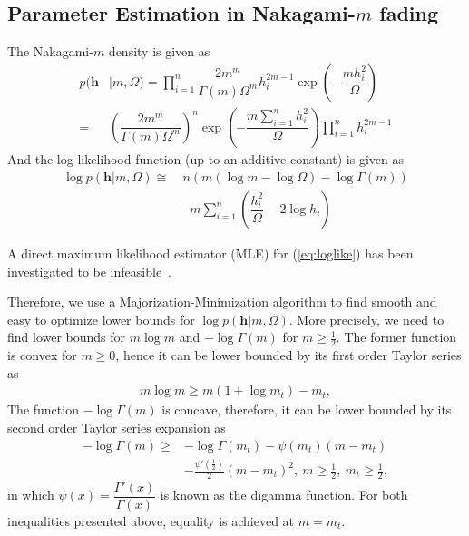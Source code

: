 \documentclass[conference, 10pt]{IEEEtran}
\begin{document}
\subsection{Parameter Estimation in Nakagami-$m$ fading}
The Nakagami-$m$ density is given as
\begin{align}
    p(\bm{h} &| m, \Omega) = \prod_{i=1}^{n}\dfrac{2m^m}{\Gamma(m)\Omega^{m}}h_i^{2m - 1}
              \exp\left(-\dfrac{mh_i^2}{\Omega}\right) \nonumber \\
          = & \left(\dfrac{2m^m}{\Gamma(m)\Omega^{m}}\right)^{n}
          \exp\left(-\dfrac{m\sum_{i=1}^{n}h_i^2}{\Omega}\right) \prod_{i=1}^{n}h_i^{2m - 1}
\end{align}
And the log-likelihood function (up to an additive constant) is given as
\begin{align}
\log p(\bm{h} | m, \Omega) \cong &~n\left(m\left(\log m - \log\Omega\right) - \log\Gamma(m)\right)\nonumber
    \\ & -m\sum_{i=1}^{n}\left(\dfrac{h_i^2}{\Omega} - 2\log h_i\right)
    \label{eq:loglike}
\end{align}

A direct maximum likelihood estimator (MLE) for (\ref{eq:loglike}) has been
investigated to be infeasible~\cite{cheng2001}.

Therefore, we use a Majorization-Minimization algorithm to find smooth
and easy to optimize lower bounds for $\log p(\bm{h}| m, \Omega)$. More precisely,
we need to find lower bounds for $m\log m$ and $-\log \Gamma(m)$ for $m \geq \frac{1}{2}$.
The former function is convex for $m \geq 0$, hence it can be lower bounded
by its first order Taylor series as
\begin{align}
    m \log m \geq m(1 + \log m_t) - m_t,
    \label{eq:lower-bound-mlogm}
\end{align}
The function $-\log \Gamma(m)$ is concave, therefore, it can be lower bounded
by its second order Taylor series expansion as
\begin{align}
    -\log \Gamma(m) \geq& - \log \Gamma(m_t) - \psi(m_t) (m - m_t)\nonumber\\
                        & - \frac{\psi'\left(\frac{1}{2}\right)}{2}(m - m_t) ^ 2,
                        ~m \geq \frac{1}{2},~m_t \geq \frac{1}{2},
    \label{eq:lower-bound-negloggamma}
\end{align}
in which $\psi(x) = \dfrac{\Gamma'(x)}{\Gamma(x)}$ is known as the digamma function.
For both inequalities presented above, equality is achieved at $m = m_t$.
\end{document}
